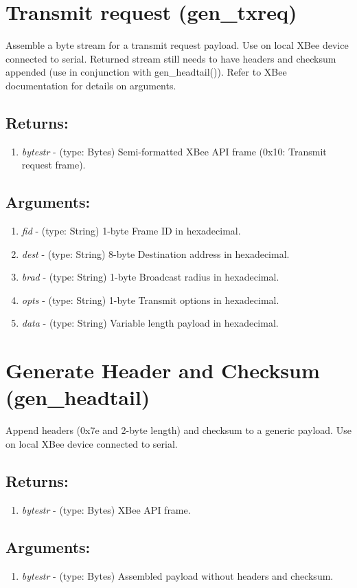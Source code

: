 \section{Transmit request (gen\_txreq)}
Assemble a byte stream for a transmit request payload. Use on local XBee device connected to serial. Returned stream still needs to have headers and checksum appended (use in conjunction with gen\_headtail()). Refer to XBee documentation for details on arguments.
\subsection{Returns:}
\begin{enumerate}
\item \emph{bytestr} - (type: Bytes) Semi-formatted XBee API frame (0x10: Transmit request frame).
\end{enumerate}
\subsection{Arguments:}
\begin{enumerate}
\item \emph{fid} - (type: String) 1-byte Frame ID in hexadecimal.
\item \emph{dest} - (type: String) 8-byte Destination address in hexadecimal.
\item \emph{brad} - (type: String) 1-byte Broadcast radius in hexadecimal.
\item \emph{opts} - (type: String) 1-byte Transmit options in hexadecimal.
\item \emph{data} - (type: String) Variable length payload in hexadecimal.
\end{enumerate}

\section{Generate Header and Checksum (gen\_headtail)}
Append headers (0x7e and 2-byte length) and checksum to a generic payload. Use on local XBee device connected to serial.
\subsection{Returns:}
\begin{enumerate}
\item \emph{bytestr} - (type: Bytes) XBee API frame.
\end{enumerate}
\subsection{Arguments:}
\begin{enumerate}
\item \emph{bytestr} - (type: Bytes) Assembled payload without headers and checksum.
\end{enumerate}

